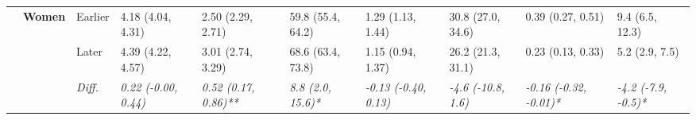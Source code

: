\documentclass[12pt, a4paper]{article}
\begin{document}
\begin{appendices}
\begin{table}[!p]
{\begin{tabular}[t]{>{}l>{}lllllllll}
        \cmidrule{2-10}
                                              & \multirow{3}{*}{\textbf{Women}}   & Earlier                       & 4.18 (4.04, 4.31)                           & 2.50 (2.29, 2.71)                            & 59.8 (55.4, 64.2)                           & 1.29 (1.13, 1.44)                           & 30.8 (27.0, 34.6)                          & 0.39 (0.27, 0.51)                               & 9.4 (6.5, 12.3)                               \\
        \cmidrule{3-10}
                                              &                                   & Later                         & 4.39 (4.22, 4.57)                           & 3.01 (2.74, 3.29)                            & 68.6 (63.4, 73.8)                           & 1.15 (0.94, 1.37)                           & 26.2 (21.3, 31.1)                          & 0.23 (0.13, 0.33)                               & 5.2 (2.9, 7.5)                                \\
        \cmidrule{3-10}
                                              &                                   & \cellcolor{gray!10}\em{Diff.} & \cellcolor{gray!10}\em{0.22 (-0.00, 0.44)}  & \cellcolor{gray!10}\em{0.52 (0.17, 0.86)**}  & \cellcolor{gray!10}\em{8.8 (2.0, 15.6)*}    & \cellcolor{gray!10}\em{-0.13 (-0.40, 0.13)} & \cellcolor{gray!10}\em{-4.6 (-10.8, 1.6)}  & \cellcolor{gray!10}\em{-0.16 (-0.32, -0.01)*}   & \cellcolor{gray!10}\em{-4.2 (-7.9, -0.5)*}    \\
        \bottomrule
      \end{tabular}}
  \end{table}
  \vspace*{\fill}


\end{appendices}
\end{document}
